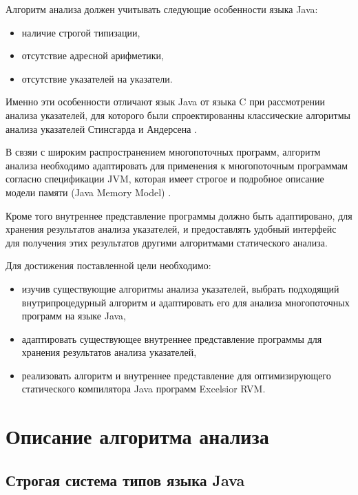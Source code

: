 \documentclass[14pt,titlepage]{extarticle}
\newcommand{\eng}[1]{{\English#1}}
\begin{document}
    Алгоритм анализа должен учитывать следующие особенности языка Java:
    \begin{itemize}
      \item наличие строгой типизации,
      \item отсутствие адресной арифметики,
      \item отсутствие указателей на указатели.
    \end{itemize}
    Именно эти особенности отличают язык Java от языка C при рассмотрении
    анализа указателей, для которого были
    спроектированны классические алгоритмы анализа указателей
    Стинсгарда \cite{steensgaard} и Андерсена \cite{andersen}.

    В свзяи с широким распространением многопоточных программ,
    алгоритм анализа необходимо адаптировать для применения к
    многопоточным программам согласно спецификации JVM, которая имеет
    строгое и подробное описание модели памяти (Java Memory Model)
    \cite{manson_jmm}.

    Кроме того внутреннее представление программы должно быть адаптировано,
    для хранения результатов анализа указателей, и предоставлять удобный
    интерфейс для получения этих результатов другими алгоритмами статического
    анализа.

    Для достижения поставленной цели необходимо:
    \begin{itemize}
      \item изучив существующие алгоритмы анализа указателей, выбрать
            подходящий внутрипроцедурный алгоритм и адаптировать его
            для анализа многопоточных программ на языке Java,
      \item адаптировать существующее внутреннее представление программы для
            хранения результатов анализа указателей,
      \item реализовать алгоритм и внутреннее представление для оптимизирующего
            статического компилятора Java программ \eng{Excelsior RVM}.
    \end{itemize}

  \newpage
  \section{Описание алгоритма анализа}
    \label{section:algorithm}

    \subsection{Строгая система типов языка Java}
    \label{section:type_system}
\end{document}
